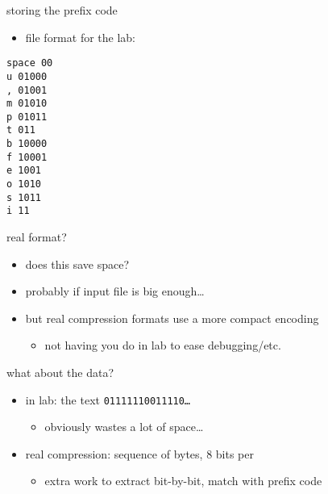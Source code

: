 \begin{frame}[fragile,label=storeCode]{storing the prefix code}
    \begin{itemize}
    \item file format for the lab:
    \end{itemize}
\begin{Verbatim}[fontsize=\fontsize{10}{11}\selectfont]
space 00
u 01000
, 01001
m 01010
p 01011
t 011
b 10000
f 10001
e 1001
o 1010
s 1011
i 11
\end{Verbatim}
\end{frame}

\begin{frame}{real format?}
    \begin{itemize}
    \item does this save space?
    \item probably if input file is big enough\ldots
    \vspace{.5cm}
    \item but real compression formats use a more compact encoding
        \begin{itemize}
        \item not having you do in lab to ease debugging/etc.
        \end{itemize}
    \end{itemize}
\end{frame}

\begin{frame}{what about the data?}
    \begin{itemize}
        \item in lab: the text \texttt{01111110011110\ldots} 
            \begin{itemize}
            \item obviously wastes a lot of space\ldots
            \end{itemize}
        \item real compression: sequence of bytes, 8 bits per
            \begin{itemize}
            \item extra work to extract bit-by-bit, match with prefix code
            \end{itemize}
    \end{itemize}
\end{frame}

